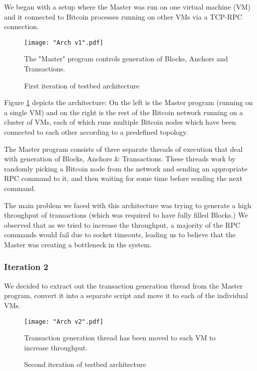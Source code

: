We began with a setup where the Master was run on one virtual machine (VM) and it connected to Bitcoin processes running on other VMs via a TCP-RPC connection.

\begin{figure}[!htb]
    \centering
    \texttt{[image: "Arch v1".pdf]}
    \caption{First iteration of testbed architecture}
    
    \medskip
    \footnotesize
    The "Master" program controls generation of Blocks, Anchors and Transactions.
    \label{fig-impl-arch-1}
\end{figure}

Figure \ref{fig-impl-arch-1} depicts the architecture: On the left is the Master program (running on a single VM) and on the right is the rest of the Bitcoin network running on a cluster of VMs, each of which runs multiple Bitcoin nodes which have been connected to each other according to a predefined topology.

The Master program consists of three separate threads of execution that deal with generation of Blocks, Anchors \& Transactions. 
These threads work by randomly picking a Bitcoin node from the network and sending an appropriate RPC command to it, and then waiting for some time before sending the next command.

The main problem we faced with this architecture was trying to generate a high throughput of transactions (which was required to have fully filled Blocks.) We observed that as we tried to increase the throughput, a majority of the RPC commands would fail due to socket timeouts, leading us to believe that the Master was creating a bottleneck in the system.


\subsubsection{Iteration 2} \label{impl-arch-2}

We decided to extract out the transaction generation thread from the Master program, convert it into a separate script and move it to each of the individual VMs. 

\begin{figure}[!htb]
    \centering
    \texttt{[image: "Arch v2".pdf]}
    \caption{Second iteration of testbed architecture}
    
    \medskip
    \footnotesize
    Transaction generation thread has been moved to each VM to increase throughput.
    \label{fig-impl-arch-2}
\end{figure}

